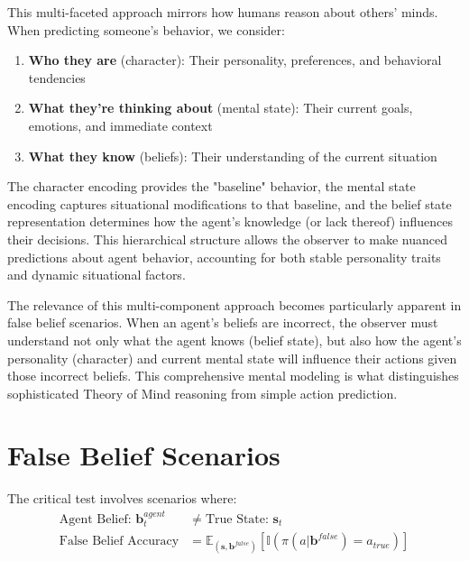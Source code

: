 \documentclass[11pt]{article}
\begin{document}
This multi-faceted approach mirrors how humans reason about others' minds. When predicting someone's behavior, we consider:
\begin{enumerate}
    \item \textbf{Who they are} (character): Their personality, preferences, and behavioral tendencies
    \item \textbf{What they're thinking about} (mental state): Their current goals, emotions, and immediate context
    \item \textbf{What they know} (beliefs): Their understanding of the current situation
\end{enumerate}

The character encoding provides the "baseline" behavior, the mental state encoding captures situational modifications to that baseline, and the belief state representation determines how the agent's knowledge (or lack thereof) influences their decisions. This hierarchical structure allows the observer to make nuanced predictions about agent behavior, accounting for both stable personality traits and dynamic situational factors.

The relevance of this multi-component approach becomes particularly apparent in false belief scenarios. When an agent's beliefs are incorrect, the observer must understand not only what the agent knows (belief state), but also how the agent's personality (character) and current mental state will influence their actions given those incorrect beliefs. This comprehensive mental modeling is what distinguishes sophisticated Theory of Mind reasoning from simple action prediction.

\section{False Belief Scenarios}

The critical test involves scenarios where:
\begin{align}
    \text{Agent Belief: } \mathbf{b}_t^{agent} &\neq \text{True State: } \mathbf{s}_t \\
    \text{False Belief Accuracy} &= \mathbb{E}_{(\mathbf{s}, \mathbf{b}^{false})} [\mathbb{I}(\pi(a | \mathbf{b}^{false}) = a_{true})]
\end{align}
\end{document}
